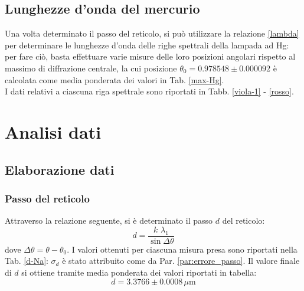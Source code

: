 \documentclass[]{article}
\let\oldsection\section%
\renewcommand{\section}{%
	\renewcommand{\theequation}{\thesection.\arabic{equation}}%
	\oldsection}%
\let\oldsubsection\subsection%
\renewcommand{\subsection}{%
	\renewcommand{\theequation}{\thesubsection.\arabic{equation}}%
	\oldsubsection}%
\begin{document}
    \subsection{Lunghezze d'onda del mercurio}
    Una volta determinato il passo del reticolo, si può utilizzare la relazione \ref{lambda} per determinare le lunghezze d'onda delle righe spettrali della lampada ad Hg: per fare ciò, basta effettuare varie misure delle loro posizioni angolari rispetto al massimo di diffrazione centrale, la cui posizione $\theta_0 = 0.978548 \pm 0.000092$ è calcolata come media ponderata dei valori in Tab. \ref{max-Hg}. \\
    I dati relativi a ciascuna riga spettrale sono riportati in Tabb. \ref{viola-1} - \ref{rosso}.

    \section{Analisi dati}
    \subsection{Elaborazione dati}
    \subsubsection{Passo del reticolo}
    Attraverso la relazione seguente, si è determinato il passo $d$ del reticolo: 
    \begin{equation}
        \label{passo}
        d = \frac{k \, \, \lambda_1}{\sin{\Delta\theta}}
    \end{equation}
    dove $\Delta\theta = \theta - \theta_0$.
    I valori ottenuti per ciascuna misura presa sono riportati nella Tab. \ref{d-Na}: $\sigma_d$ è stato attribuito come da Par. \ref{par:errore_passo}.
    Il valore finale di $d$ si ottiene tramite media ponderata dei valori riportati in tabella:
    \begin{equation}
        \label{d-value}
        d = 3.3766 \pm 0.0008 \,\mu\text{m}
    \end{equation}
\end{document}

